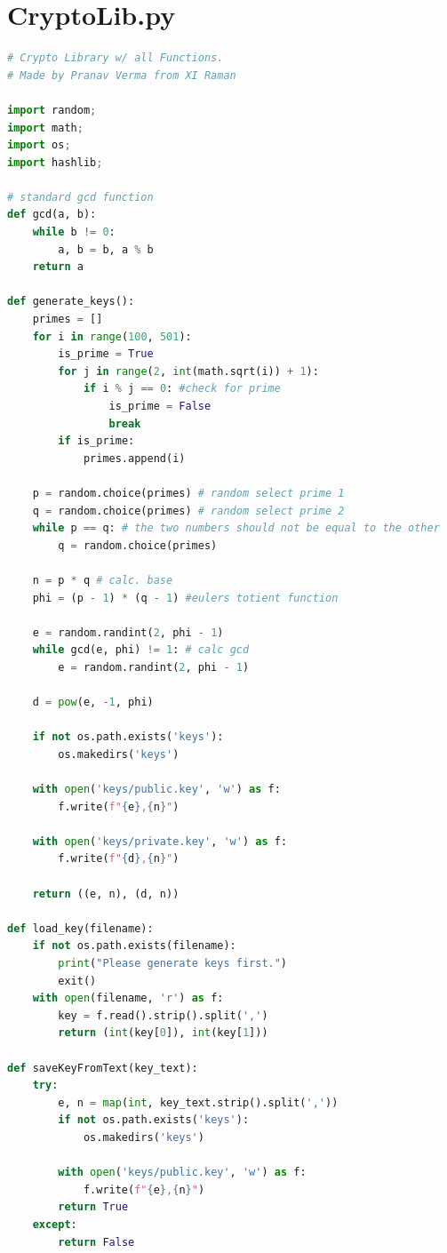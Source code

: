 \documentclass[12pt,a4paper]{report}
\begin{document}
\section{CryptoLib.py}
\begin{lstlisting}[language=Python]
# Crypto Library w/ all Functions.
# Made by Pranav Verma from XI Raman

import random;
import math;
import os;
import hashlib;

# standard gcd function
def gcd(a, b):
    while b != 0:
        a, b = b, a % b
    return a

def generate_keys():
    primes = []
    for i in range(100, 501):
        is_prime = True
        for j in range(2, int(math.sqrt(i)) + 1):
            if i % j == 0: #check for prime
                is_prime = False
                break
        if is_prime:
            primes.append(i)

    p = random.choice(primes) # random select prime 1
    q = random.choice(primes) # random select prime 2
    while p == q: # the two numbers should not be equal to the other 
        q = random.choice(primes)

    n = p * q # calc. base
    phi = (p - 1) * (q - 1) #eulers totient function

    e = random.randint(2, phi - 1)
    while gcd(e, phi) != 1: # calc gcd
        e = random.randint(2, phi - 1)

    d = pow(e, -1, phi)

    if not os.path.exists('keys'):
        os.makedirs('keys')

    with open('keys/public.key', 'w') as f:
        f.write(f"{e},{n}")

    with open('keys/private.key', 'w') as f:
        f.write(f"{d},{n}")

    return ((e, n), (d, n))

def load_key(filename):
    if not os.path.exists(filename):
        print("Please generate keys first.")
        exit()
    with open(filename, 'r') as f:
        key = f.read().strip().split(',')
        return (int(key[0]), int(key[1]))
    
def saveKeyFromText(key_text):
    try:
        e, n = map(int, key_text.strip().split(','))
        if not os.path.exists('keys'):
            os.makedirs('keys')
            
        with open('keys/public.key', 'w') as f:
            f.write(f"{e},{n}")
        return True
    except:
        return False
    

\end{lstlisting}
\end{document}
